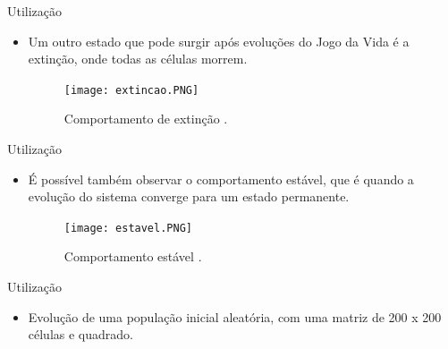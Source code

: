 \documentclass[compress, hide notes]{beamer}
\begin{document}
\begin{frame}{Utilização}
	
	\begin{itemize}
	
		\item Um outro estado que pode surgir após evoluções do Jogo da Vida é a extinção, onde todas as células morrem.
				
		\begin{figure}[h]
										
			\center
															
			\texttt{[image: extincao.PNG]}
			\caption{Comportamento de extinção \cite{ufmg}.}
									
		\end{figure}
		
	\end{itemize}
	
\end{frame}

\begin{frame}{Utilização}
	
	\begin{itemize}
	
		\item É possível também observar o comportamento estável, que é quando a evolução do sistema converge para um estado permanente.
				
		\begin{figure}[h]
										
			\center
															
			\texttt{[image: estavel.PNG]}
			\caption{Comportamento estável \cite{ufmg}.}
									
		\end{figure}
		
	\end{itemize}
	
\end{frame}

\begin{frame}{Utilização}
	
	\begin{itemize}
	
		\item Evolução de uma população inicial aleatória, com uma matriz de 200 x 200 células e  quadrado.
	
	\end{itemize}
	
\end{frame}
\end{document}
